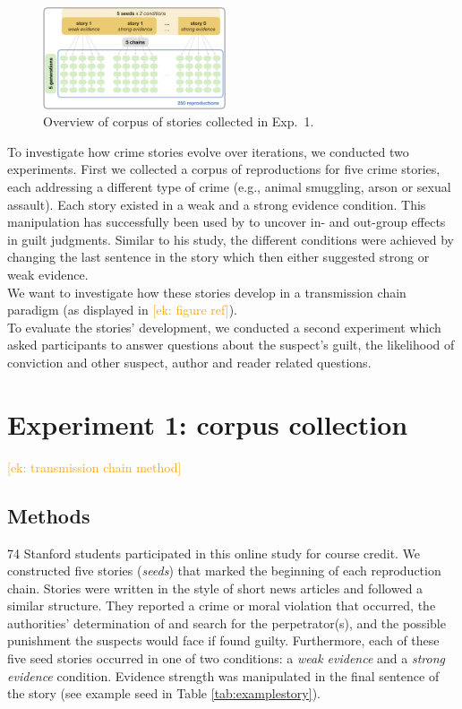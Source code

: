 \documentclass[10pt,letterpaper]{article}
\newcommand{\ek}[1]{\textcolor{Orange}{[ek: #1]}}
\begin{document}
\begin{figure}[]
	\includegraphics[width=0.48\textwidth]{graphs/corpus_overview.png}
	\caption{Overview of corpus of stories collected in Exp.~1.} 
	\label{fig:design}
\end{figure}

To investigate how crime stories evolve over iterations, we conducted two experiments. First we collected a corpus of reproductions for five crime stories, each addressing a different type of crime (e.g., animal smuggling, arson or sexual assault). Each story existed in a weak and a strong evidence condition. This manipulation has successfully been used by \cite{Van-Prooijen:2006} to uncover in- and out-group effects in guilt judgments. Similar to his study, the different conditions were achieved by changing the last sentence in the story which then either suggested strong or weak evidence. \\
We want to investigate how these stories develop in a transmission chain paradigm (as displayed in \ek{figure ref}).\\
To evaluate the stories' development, we conducted a second experiment which asked participants to answer questions about the suspect's guilt, the likelihood of conviction and other suspect, author and reader related questions. 


\section{Experiment 1: corpus collection}
\ek{transmission chain method}

\subsection{Methods}
74 Stanford students participated in this online study for course credit. 
We constructed five stories (\textit{seeds}) that marked the beginning of each reproduction chain.  Stories were written in the style of short news articles and followed a similar structure. They reported a crime or moral violation that occurred, the authorities' determination of and search for the perpetrator(s), and  the possible punishment the suspects would face if found guilty. Furthermore, each of these five seed stories occurred in one of two conditions: a \emph{weak evidence} and a \emph{strong evidence} condition. Evidence strength was manipulated in the final sentence of the story (see example seed in Table \ref{tab:examplestory}).
\end{document}
